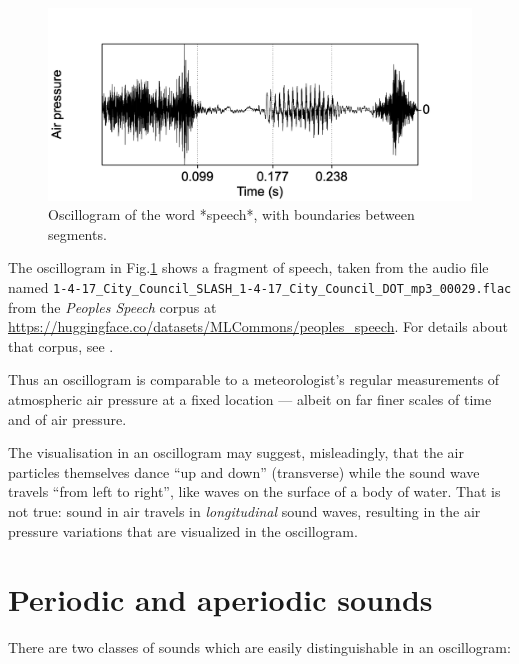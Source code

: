 \documentclass[
]{book}
\begin{document}
\begin{figure}

{\centering \includegraphics{figures/speech_word_oscillogram} 

}

\caption{Oscillogram of the word *speech*, with boundaries between segments.}\label{fig:speech-oscillogram}
\end{figure}

\label{box-speechfile-details}
The oscillogram in Fig.\ref{fig:speech-oscillogram} shows a fragment of speech, taken from the audio file named \texttt{1-4-17\_City\_Council\_SLASH\_1-4-17\_City\_Council\_DOT\_mp3\_00029.flac} from the \emph{Peoples Speech} corpus at \url{https://huggingface.co/datasets/MLCommons/peoples_speech}. For details about that corpus, see \citet{Galvez_Diamos_Ciro_Cerón_Achorn_Gopi_Kanter_Lam_Mazumder_Reddi_2021}.

Thus an oscillogram is comparable to a meteorologist's regular measurements of atmospheric air pressure at a fixed location --- albeit on far finer scales of time and of air pressure.

The visualisation in an oscillogram may suggest, misleadingly, that the air particles themselves dance ``up and down'' (transverse) while the sound wave travels ``from left to right'', like waves on the surface of a body of water. That is not true: sound in air travels in \emph{longitudinal} sound waves, resulting in the air pressure variations that are visualized in the oscillogram.

\section{Periodic and aperiodic sounds}\label{sec:periodicity}

There are two classes of sounds which are easily distinguishable in an oscillogram:
\end{document}
